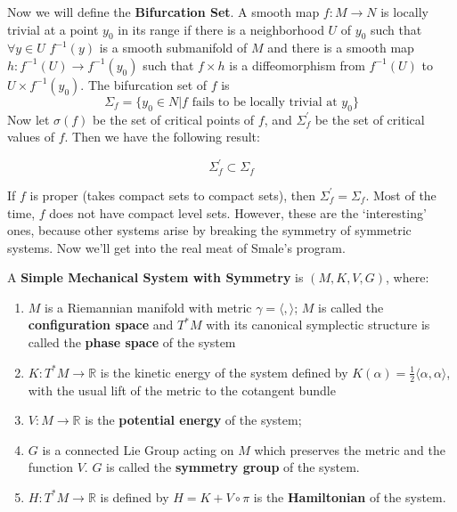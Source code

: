 Now we will define the \textbf{Bifurcation Set}. A smooth map $f:M \to N$ is locally trivial at a point $y_0$ in its range if there is a neighborhood $U$ of $y_0$ such that $\forall y \in U$ $f^{-1}(y)$ is a smooth submanifold of $M$ and there is a smooth map $h:f^{-1}(U) \to f^{-1}(y_0)$ such that $f \times h$ is a diffeomorphism from $f^{-1}(U)$ to $U \times f^{-1}(y_0)$. The bifurcation set of $f$ is 
\begin{equation}\Sigma_f = \{ y_0 \in N \vert f \text{ fails to be locally trivial at } y_0 \}\end{equation}
Now let $\sigma(f)$ be the set of critical points of $f$, and $\Sigma^{\prime}_f$ be the set of critical values of $f$. Then we have the following result:

\begin{prop}
\begin{equation}\Sigma^{\prime}_f \subset \Sigma_f\end{equation}
\end{prop}

If $f$ is proper (takes compact sets to compact sets), then $\Sigma^{\prime}_f = \Sigma_f$. Most of the time, $f$ does not have compact level sets. However, these are the `interesting' ones, because other systems arise by breaking the symmetry of symmetric systems. Now we'll get into the real meat of Smale's program.

\begin{defn}

A \textbf{Simple Mechanical System with Symmetry} is $(M,K,V,G)$, where:
\begin{enumerate}
    \item $M$ is a Riemannian manifold with metric $\gamma = \langle, \rangle$; $M$ is called the \textbf{configuration space} and $T^*M$ with its canonical symplectic structure is called the \textbf{phase space} of the system
    \item $K:T^*M \to \mathbb{R}$ is the kinetic energy of the system defined by $K(\alpha) = \frac{1}{2}\langle \alpha, \alpha \rangle$, with the usual lift of the metric to the cotangent bundle
    \item $V:M \to \mathbb{R}$ is the \textbf{potential energy} of the system;
    \item $G$ is a connected Lie Group acting on $M$ which preserves the metric and the function $V$. $G$ is called the \textbf{symmetry group} of the system.
    \item $H:T^*M \to \mathbb{R}$ is defined by $H=K + V \circ \pi$ is the \textbf{Hamiltonian} of the system.
\end{enumerate}
\end{defn}

